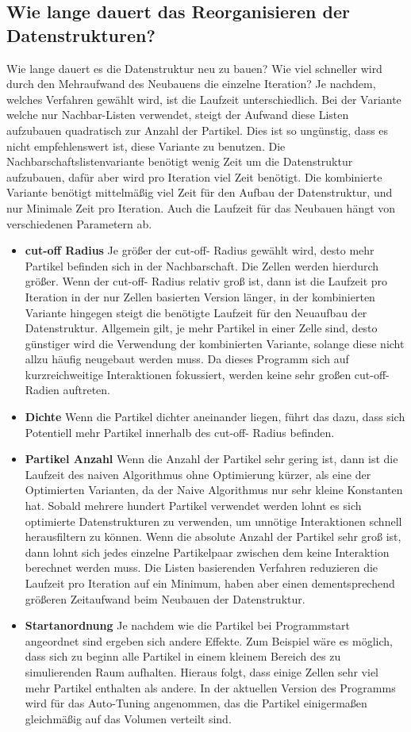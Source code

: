 \documentclass[
12pt,
a4paper,
BCOR10mm,
DIV14,
headsepline,
]{scrreprt}
\begin{document}
	\subsection{Wie lange dauert das Reorganisieren der Datenstrukturen?}%
	Wie lange dauert es die Datenstruktur neu zu bauen? Wie viel schneller wird durch den Mehraufwand des Neubauens die einzelne Iteration? Je nachdem, welches Verfahren gewählt wird, ist die Laufzeit unterschiedlich. Bei der Variante welche nur Nachbar-Listen verwendet, steigt der Aufwand diese Listen aufzubauen quadratisch zur Anzahl der Partikel. Dies ist so ungünstig, dass es nicht empfehlenswert ist, diese Variante zu benutzen. Die Nachbarschaftslistenvariante benötigt wenig Zeit um die Datenstruktur aufzubauen, dafür aber wird pro Iteration viel Zeit benötigt. Die kombinierte Variante benötigt mittelmäßig viel Zeit für den Aufbau der Datenstruktur, und nur Minimale Zeit pro Iteration. Auch die Laufzeit für das Neubauen hängt von verschiedenen Parametern ab.
	\begin{itemize}
		\item \textbf{cut-off Radius} Je größer der cut-off- Radius gewählt wird, desto mehr Partikel befinden sich in der Nachbarschaft. Die Zellen werden hierdurch größer. Wenn der cut-off- Radius relativ groß ist, dann ist die Laufzeit pro Iteration in der nur Zellen basierten Version länger, in der kombinierten Variante hingegen steigt die benötigte Laufzeit für den Neuaufbau der Datenstruktur. Allgemein gilt, je mehr Partikel in einer Zelle sind, desto günstiger wird die Verwendung der kombinierten Variante, solange diese nicht allzu häufig neugebaut werden muss. Da dieses Programm sich auf kurzreichweitige Interaktionen fokussiert, werden keine sehr großen cut-off- Radien auftreten.
		\item \textbf{Dichte} Wenn die Partikel dichter aneinander liegen, führt das dazu, dass sich Potentiell mehr Partikel innerhalb des cut-off- Radius befinden.
		\item \textbf{Partikel Anzahl} Wenn die Anzahl der Partikel sehr gering ist, dann ist die Laufzeit des naiven Algorithmus ohne Optimierung kürzer, als eine der Optimierten Varianten, da der Naive Algorithmus nur sehr kleine Konstanten hat. Sobald mehrere hundert Partikel verwendet werden lohnt es sich optimierte Datenstrukturen zu verwenden, um unnötige Interaktionen schnell herausfiltern zu können. Wenn die absolute Anzahl der Partikel sehr groß ist, dann lohnt sich jedes einzelne Partikelpaar zwischen dem keine Interaktion berechnet werden muss. Die Listen basierenden Verfahren reduzieren die Laufzeit pro Iteration auf ein Minimum, haben aber einen dementsprechend größeren Zeitaufwand beim Neubauen der Datenstruktur. 
		\item \textbf{Startanordnung} Je nachdem wie die Partikel bei Programmstart angeordnet sind ergeben sich andere Effekte. Zum Beispiel wäre es möglich, dass sich zu beginn alle Partikel in einem kleinem Bereich des zu simulierenden Raum aufhalten. Hieraus folgt, dass einige Zellen sehr viel mehr Partikel enthalten als andere. In der aktuellen Version des Programms wird für das Auto-Tuning angenommen, das die Partikel einigermaßen gleichmäßig auf das Volumen verteilt sind.
	\end{itemize}
\end{document}
